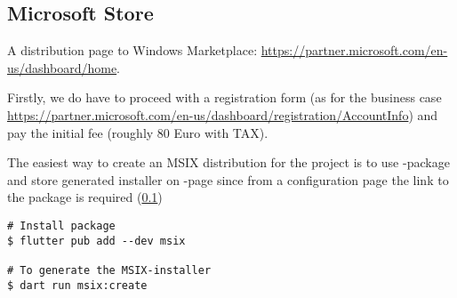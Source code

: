 
\subsection{Microsoft Store}

A distribution page to Windows Marketplace: 
\href{https://partner.microsoft.com/en-us/dashboard/home}{https://partner.microsoft.com/en-us/dashboard/home}.

Firstly, we do have to proceed with a registration form (as for the business case
\href{https://partner.microsoft.com/en-us/dashboard/registration/AccountInfo}{https://partner.microsoft.com/en-us/dashboard/registration/AccountInfo})
and pay the initial fee (roughly 80 Euro with TAX).

The easiest way to create an MSIX distribution for the project is to use -package and store generated installer 
on -page since from a configuration page the link to the package is required (\cref{})

\begin{lstlisting}[language=terminal]
# Install package
$ flutter pub add --dev msix

# To generate the MSIX-installer
$ dart run msix:create
\end{lstlisting}

